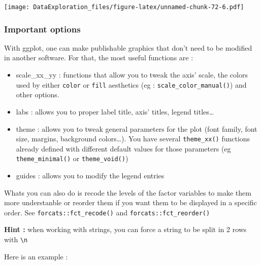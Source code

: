 \documentclass[
]{book}
\providecommand{\tightlist}{%
  \setlength{\itemsep}{0pt}\setlength{\parskip}{0pt}}
\begin{document}
\texttt{[image: DataExploration\_files/figure-latex/unnamed-chunk-72-6.pdf]}

\hypertarget{important-options}{%
\subsubsection{Important options}\label{important-options}}

With ggplot, one can make publishable graphics that don't need to be modified in another software. For that, the most useful functions are :

\begin{itemize}
\tightlist
\item
  scale\_xx\_yy : functions that allow you to tweak the axis' scale, the colors used by either \texttt{color} or \texttt{fill} aesthetics (eg : \texttt{scale\_color\_manual()}) and other options.
\item
  labs : allows you to proper label title, axis' titles, legend titles\ldots{}
\item
  theme : allows you to tweak general parameters for the plot (font family, font size, margins, background colors\ldots). You have several \texttt{theme\_xx()} functions already defined with different default values for those parameters (eg \texttt{theme\_minimal()} or \texttt{theme\_void()})
\item
  guides : allows you to modify the legend entries
\end{itemize}

Whats you can also do is recode the levels of the factor variables to make them more understanble or reorder them if you want them to be displayed in a specific order. See \texttt{forcats::fct\_recode()} and \texttt{forcats::fct\_reorder()}

\textbf{Hint :} when working with strings, you can force a string to be split in 2 rows with \texttt{\textbackslash{}n}

Here is an example :
\end{document}
